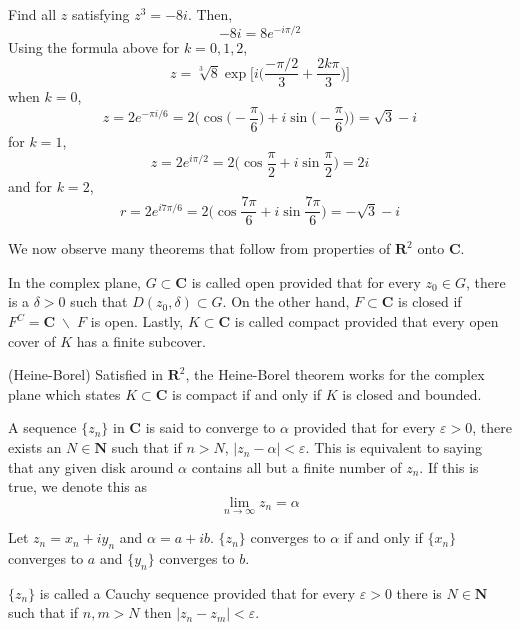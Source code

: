 \vspace{2ex}
\begin{ex}
Find all $z$ satisfying $z^3=-8i$. Then,
\[-8i=8e^{-i\pi /2}\]
Using the formula above for $k=0,1,2$, 
\[z=\sqrt[3]{8}\exp\Big[i\Big(\dfrac{-\pi /2}{3}+\dfrac{2k\pi }{3}\Big)\Big]\]
when $k=0$, 
\[z=2e^{-\pi i/6}=2\Big(\cos\Big(-\dfrac{\pi }{6}\Big)+i\sin \Big(-\dfrac{\pi }{6}\Big) \Big)=\sqrt{3}-i\]
for $k=1$,
\[z=2e^{i\pi /2}=2\Big(\cos \dfrac{\pi }{2}+i\sin \dfrac{\pi }{2}\Big)=2i\]
and for $k=2$,
\[r=2e^{i7\pi /6}=2\Big(\cos \dfrac{7\pi }{6}+i\sin\dfrac{7\pi }{6} \Big)=-\sqrt{3}-i\]
\end{ex}
\vspace{2ex}
We now observe many theorems that follow from properties of ${\bm R}^2$ onto ${\bm C}$.
\\
\begin{defi}
In the complex plane, $G\subset {\bm C}$ is called open provided that for every $z_0\in G$, there is a $\delta >0$ such that $D(z_0,\delta )\subset G$. On the other hand, $F\subset {\bm C}$ is closed if $F^{C}={\bm C}\;\backslash\;F$ is open. Lastly, $K\subset {\bm C}$ is called compact provided that every open cover of $K$ has a finite subcover.
\end{defi}
\vspace{2ex}
\begin{thm}
	(Heine-Borel) Satisfied in ${\bm R}^2$, the Heine-Borel theorem works for the complex plane which states $K\subset {\bm C}$ is compact if and only if $K$ is closed and bounded.
\end{thm}
\vspace{2ex}
\begin{defi}
A sequence $\{z_{n}\}$ in ${\bm C}$ is said to converge to $\alpha $ provided that for every $\varepsilon >0$, there exists an $N\in {\bm N}$ such that if $n>N$, $|z_{n}-\alpha |<\varepsilon $. This is equivalent to saying that any given disk around $\alpha $ contains all but a finite number of $z_{n}$. If this is true, we denote this as
\[\lim_{n\rightarrow \infty }z_{n}=\alpha \]
\end{defi}
\vspace{2ex}
\begin{defi}
	Let $z_{n}=x_{n}+iy_{n}$ and $\alpha =a+ib$. $\{z_{n}\}$ converges to $\alpha $ if  and only if $\{x_{n}\}$ converges to $a$ and $\{y_{n}\}$ converges to $b$.
\end{defi}
\vspace{2ex}
\begin{defi}
$\{z_{n}\}$ is called a Cauchy sequence provided that for every $\varepsilon >0$ there is $N\in {\bm N}$ such that if $n,m>N$ then $|z_{n}-z_{m}|<\varepsilon $.
\end{defi}
